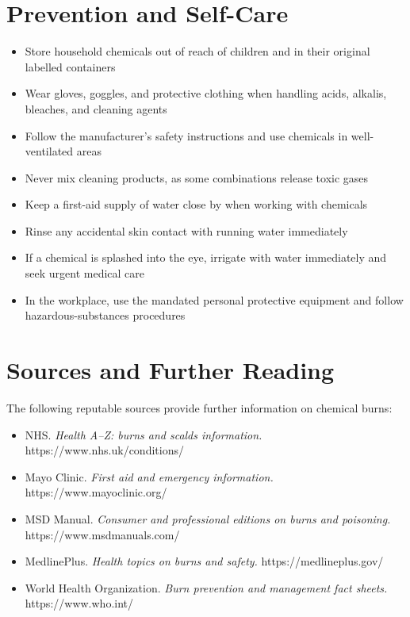 \section*{Prevention and Self-Care}
\begin{itemize}
    \item Store household chemicals out of reach of children and in their original labelled containers
    \item Wear gloves, goggles, and protective clothing when handling acids, alkalis, bleaches, and cleaning agents
    \item Follow the manufacturer's safety instructions and use chemicals in well-ventilated areas
    \item Never mix cleaning products, as some combinations release toxic gases
    \item Keep a first-aid supply of water close by when working with chemicals
    \item Rinse any accidental skin contact with running water immediately
    \item If a chemical is splashed into the eye, irrigate with water immediately and seek urgent medical care
    \item In the workplace, use the mandated personal protective equipment and follow hazardous-substances procedures
\end{itemize}

\section*{Sources and Further Reading}
The following reputable sources provide further information on chemical burns:
\begin{itemize}
    \item NHS. \textit{Health A--Z: burns and scalds information.} https://www.nhs.uk/conditions/
    \item Mayo Clinic. \textit{First aid and emergency information.} https://www.mayoclinic.org/
    \item MSD Manual. \textit{Consumer and professional editions on burns and poisoning.} https://www.msdmanuals.com/
    \item MedlinePlus. \textit{Health topics on burns and safety.} https://medlineplus.gov/
    \item World Health Organization. \textit{Burn prevention and management fact sheets.} https://www.who.int/
\end{itemize}

